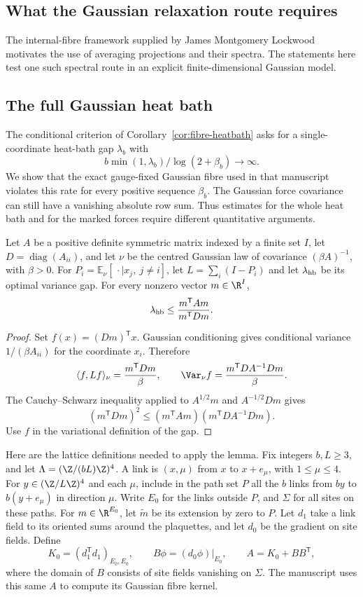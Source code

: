 \subsection{What the Gaussian relaxation route requires}\label{round26:sec:ym-relaxation}
The internal-fibre framework supplied by James Montgomery Lockwood motivates the use of averaging projections and their spectra. The statements here test one such spectral route in an explicit finite-dimensional Gaussian model.
\subsection{The full Gaussian heat bath}


The conditional criterion of Corollary~\ref{cor:fibre-heatbath} asks for a
single-coordinate heat-bath gap $\lambda_b$ with
\[
 b\min(1,\lambda_b)/\log(2+\beta_b)\longrightarrow\infty.
\]
We show that the exact
gauge-fixed Gaussian fibre used in that manuscript violates this rate for
every positive sequence $\beta_b$. The Gaussian force covariance can still
have a vanishing absolute row sum. Thus estimates for the whole heat bath
and for the marked forces require different quantitative arguments.

\begin{lemma}\label{round26:linear}
Let $A$ be a positive definite symmetric matrix indexed by a finite set
$I$, let $D=\operatorname{diag}(A_{ii})$, and let $\nu$ be the centred
Gaussian law of covariance $(\beta A)^{-1}$, with $\beta>0$.
For $P_i=\mathbb E_\nu[\,\cdot\mid x_j,\ j\ne i]$, let
$L=\sum_i(I-P_i)$ and let $\lambda_{\rm hb}$ be its optimal variance gap.
For every nonzero vector $m\in\R^I$,
\[
 \lambda_{\rm hb}\le\frac{m^{\mathsf T}Am}{m^{\mathsf T}Dm}.
\]
\end{lemma}
\begin{proof}
Set $f(x)=(Dm)^{\mathsf T}x$. Gaussian conditioning gives conditional
variance $1/(\beta A_{ii})$ for the coordinate $x_i$. Therefore
\[
 \langle f,Lf\rangle_\nu=\frac{m^{\mathsf T}Dm}{\beta},\qquad
 \Var_\nu f=\frac{m^{\mathsf T}DA^{-1}Dm}{\beta}.
\]
The Cauchy--Schwarz inequality applied to $A^{1/2}m$ and $A^{-1/2}Dm$
gives
\[
 (m^{\mathsf T}Dm)^2\le(m^{\mathsf T}Am)(m^{\mathsf T}DA^{-1}Dm).
\]
Use $f$ in the variational definition of the gap.
\end{proof}

Here are the lattice definitions needed to apply the lemma.
Fix integers $b,L\ge3$, and let $\Lambda=(\Z/(bL)\Z)^4$. A link is
$(x,\mu)$ from $x$ to $x+e_\mu$, with $1\le\mu\le4$.
For $y\in(\Z/L\Z)^4$ and each $\mu$, include in the path set $P$ all
the $b$ links from $by$ to $b(y+e_\mu)$ in direction $\mu$. Write $E_0$
for the links outside $P$, and $\Sigma$ for all sites on these paths.
For $m\in\R^{E_0}$, let $\widetilde m$ be its extension by zero to $P$.
Let $d_1$ take a link field to its oriented sums around the plaquettes,
and let $d_0$ be the gradient on site fields. Define
\[
 K_0=(d_1^{\mathsf T}d_1)_{E_0,E_0},\qquad
 B\phi=(d_0\phi)|_{E_0},\qquad A=K_0+BB^{\mathsf T},
\]
where the domain of $B$ consists of site fields vanishing on $\Sigma$.
The manuscript uses this same $A$ to compute its Gaussian fibre kernel.

